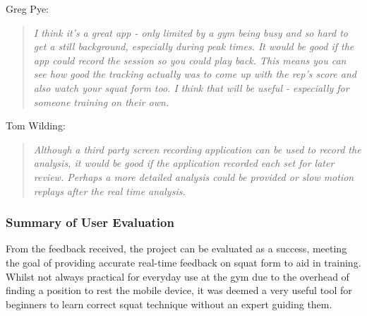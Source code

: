Greg Pye:
\begin{quote}
\emph{I think it's a great app - only limited by a gym being busy and so hard to get a still background, especially during peak times. It would be good if the app could record the session so you could play back. This means you can see how good the tracking actually was to come up with the rep's score and also watch your squat form too. I think that will be useful - especially for someone training on their own.}
\end{quote}

Tom Wilding:
\begin{quote}
\emph{Although a third party screen recording application can be used to record the analysis, it would be good if the application recorded each set for later review. Perhaps a more detailed analysis could be provided or slow motion replays after the real time analysis.}
\end{quote}

\subsubsection{Summary of User Evaluation}

From the feedback received, the project can be evaluated as a success, meeting the goal of providing accurate real-time feedback on squat form to aid in training. Whilst not always practical for everyday use at the gym due to the overhead of finding a position to rest the mobile device, it was deemed a very useful tool for beginners to learn correct squat technique without an expert guiding them.